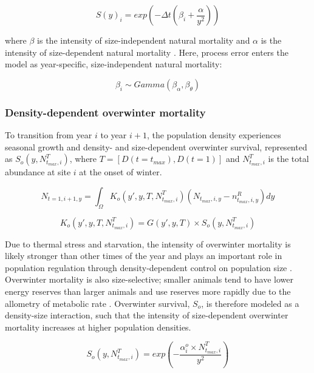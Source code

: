 \documentclass{article}
\begin{document}
\begin{equation}
S(y)_i = exp(-\Delta t(\beta_i+\frac{\alpha}{y^2}))
\end{equation}

where $\beta$ is the intensity of size-independent natural mortality and $\alpha$ is the intensity of size-dependent natural mortality \parencite{carlson2010bayesian}. Here, process error enters the model as year-specific, size-independent natural mortality:

\begin{equation}
\beta_i \sim Gamma(\beta_{\alpha}, \beta_{\theta})
\end{equation}

\subsubsection*{Density-dependent overwinter mortality}

To transition from year $i$ to year $i+1$, the population density experiences seasonal growth and density- and size-dependent overwinter survival, represented as $S_o(y, N^T_{t_{max},i})$, where $T=[D(t=t_{max}), D(t=1)]$ and $N^T_{t_{max},i}$ is the total abundance at site $i$ at the onset of winter. 

\begin{equation}
N_{t=1,i+1,y} = \int_{\Omega} K_o(y',y, T,N^T_{t_{max},i}) (N_{t_{max},i,y} - n^R_{t_{max},i,y}) dy 
\end{equation}

\begin{equation}
K_o(y',y, T,N^T_{t_{max},i}) = G(y',y, T) \times S_o(y,N^T_{t_{max},i})
\end{equation}

Due to thermal stress and starvation, the intensity of overwinter mortality is likely stronger than other times of the year and plays an important role in population regulation through density-dependent control on population size \parencite{henderson1988size}. Overwinter mortality is also size-selective; smaller animals tend to have lower energy reserves than larger animals and use reserves more rapidly due to the allometry of metabolic rate \parencite{hurst2007causes}. Overwinter survival, $S_o$, is therefore modeled as a density-size interaction, such that the intensity of size-dependent overwinter mortality increases at higher population densities. 

\begin{equation}
S_o(y,N^T_{t_{max},i}) = exp(-\frac{\alpha_i^o \times N^T_{t_{max},i}}{y^2})
\end{equation}
\end{document}

